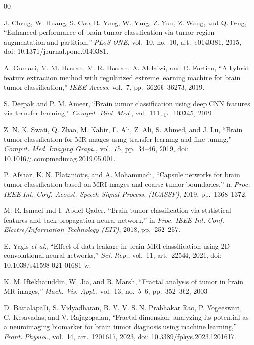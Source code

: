 \documentclass[journal]{IEEEtran}
\begin{document}
\begin{thebibliography}{00}

J. Cheng, W. Huang, S. Cao, R. Yang, W. Yang, Z. Yun, Z. Wang, and Q. Feng,
``Enhanced performance of brain tumor classification via tumor region
augmentation and partition,'' \emph{PLoS ONE}, vol.~10, no.~10, art.~e0140381,
2015, doi: 10.1371/journal.pone.0140381.

A. Gumaei, M. M. Hassan, M. R. Hassan, A. Alelaiwi, and G. Fortino, ``A hybrid
feature extraction method with regularized extreme learning machine for brain
tumor classification,'' \emph{IEEE Access}, vol.~7, pp.~36266--36273, 2019.

S. Deepak and P. M. Ameer, ``Brain tumor classification using deep CNN features
via transfer learning,'' \emph{Comput. Biol. Med.}, vol.~111, p.~103345, 2019.

Z. N. K. Swati, Q. Zhao, M. Kabir, F. Ali, Z. Ali, S. Ahmed, and J. Lu, ``Brain
tumor classification for MR images using transfer learning and fine-tuning,''
\emph{Comput. Med. Imaging Graph.}, vol.~75, pp.~34--46, 2019,
doi: 10.1016/j.compmedimag.2019.05.001.

P. Afshar, K. N. Plataniotis, and A. Mohammadi, ``Capsule networks for brain
tumor classification based on MRI images and coarse tumor boundaries,'' in
\emph{Proc. IEEE Int. Conf. Acoust. Speech Signal Process. (ICASSP)}, 2019,
pp.~1368--1372.

M. R. Ismael and I. Abdel-Qader, ``Brain tumor classification via statistical
features and back-propagation neural network,'' in \emph{Proc. IEEE Int. Conf.
Electro/Information Technology (EIT)}, 2018, pp.~252--257.

E. Yagis \emph{et al.}, ``Effect of data leakage in brain MRI classification
using 2D convolutional neural networks,'' \emph{Sci. Rep.}, vol.~11, art.~22544,
2021, doi: 10.1038/s41598-021-01681-w.

K. M. Iftekharuddin, W. Jia, and R. Marsh, ``Fractal analysis of tumor in brain
MR images,'' \emph{Mach. Vis. Appl.}, vol.~13, no.~5--6, pp.~352--362, 2003.

D. Battalapalli, S. Vidyadharan, B. V. V. S. N. Prabhakar Rao, P. Yogeeswari,
C. Kesavadas, and V. Rajagopalan, ``Fractal dimension: analyzing its potential
as a neuroimaging biomarker for brain tumor diagnosis using machine learning,''
\emph{Front. Physiol.}, vol.~14, art.~1201617, 2023,
doi: 10.3389/fphys.2023.1201617.


\end{thebibliography}
\end{document}
